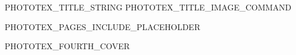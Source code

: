 \documentclass[11pt, a4paper, twoside, openright]{book}
\begin{document}
\pagestyle{empty}

\begin{titlepage}
  \hspace{0pt}
  \vfill%
  \begin{center}
    {\fontsize{PHOTOTEX_TITLE_FONT_SIZE}{PHOTOTEX_TITLE_LEADING_SIZE}\selectfont
      PHOTOTEX_TITLE_STRING}
    PHOTOTEX_TITLE_IMAGE_COMMAND
  \end{center}
  \vfill%
  \hspace{0pt}
\end{titlepage}
\newpage\null\thispagestyle{empty}\newpage%

PHOTOTEX_PAGES_INCLUDE_PLACEHOLDER

\newcommand*\cleartoleftpage{%
  \clearpage
  \ifodd\value{page}\hbox{}\newpage\fi
}

\cleartoleftpage%
\begin{center}
  {\Huge PHOTOTEX_FOURTH_COVER}
\end{center}

\end{document}
